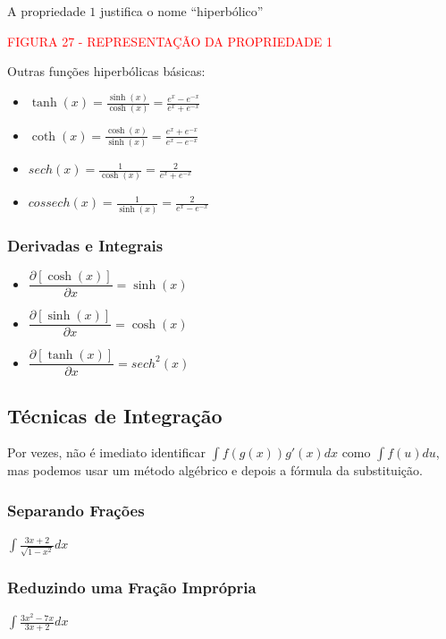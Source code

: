 \documentclass[oneside,a4paper,12pt]{article}
\begin{document}
A propriedade $1$ justifica o nome ``hiperbólico''


\vspace{220pt}
\begin{center}
	\textcolor{red}{FIGURA 27 - REPRESENTAÇÃO DA PROPRIEDADE 1}
\end{center}

Outras funções hiperbólicas básicas:
\begin{itemize}
	\item $\tanh(x) = \frac{\sinh(x)}{\cosh(x)} = \frac{e^x - e^{-x}}{e^x + e^{-x}}$
	\item $\coth(x) = \frac{\cosh(x)}{\sinh(x)} = \frac{e^x + e^{-x}}{e^x - e^{-x}}$
	\item $sech(x) = \frac{1}{\cosh(x)} = \frac{2}{e^x + e^{-x}}$
	\item $cossech(x) = \frac{1}{\sinh(x)} = \frac{2}{e^x - e^{-x}}$	
\end{itemize}

\subsubsection{Derivadas e Integrais}
\begin{itemize}
	\item $\dfrac{\partial [\cosh(x)]}{\partial x} = \sinh(x)$
	\item $\dfrac{\partial [\sinh(x)]}{\partial x} = \cosh(x)$
	\item $\dfrac{\partial [\tanh(x)]}{\partial x} = sech^{2}(x)$	
\end{itemize}

\subsection{Técnicas de Integração}

Por vezes, não é imediato identificar $\int f(g(x))g'(x)dx$ como $\int f(u)du$, mas podemos usar um método algébrico e depois a fórmula da substituição.

\subsubsection{Separando Frações}
$\int \frac{3x + 2}{\sqrt{1-x^2}}dx$

\vspace{400pt}

\subsubsection{Reduzindo uma Fração Imprópria}
$\int \frac{3x^2 - 7x}{3x + 2}dx$
\end{document}
